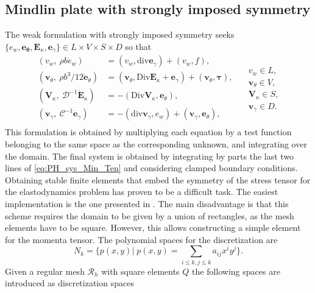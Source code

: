 \documentclass{ifacconf}
\begin{document}
\subsection{Mindlin plate with strongly imposed symmetry}\label{sec:min_strong}

The weak formulation with strongly imposed symmetry seeks $\{e_w, \bm{e}_{\bm{\theta}}, \bm{E}_{\kappa}, \bm{e}_{\gamma}\} \in L \times V \times S \times D$ so that 
\begin{equation}
\label{eq:weak_min_PH_strong}
\begin{aligned}
(v_w, \ \rho b \dot{e}_w) &= (v_w, \mathrm{div} \bm{e}_\gamma) + (v_w, f), \\ 
(\bm{v}_\theta, \ \rho b^3/12  \dot{\bm{e}}_\theta) &= (\bm{v}_\theta, \mathrm{Div} \bm{E}_\kappa + \bm{e}_\gamma) + (\bm{v}_\theta, \bm{\tau}), \\  
(\bm{V}_\kappa, \ \mathcal{D}^{-1} \dot{\bm{E}}_\kappa) &= -(\mathrm{Div} \bm{V}_\kappa,  \bm{e}_\theta), \\ 
(\bm{v}_\gamma, \ \mathcal{C}^{-1} \dot{\bm{e}}_\gamma) &= -(\mathrm{div} \bm{v}_\gamma, e_w ) + (\bm{v}_\gamma, \bm{e}_{\theta}), \\ 
\end{aligned} \quad
\begin{aligned}
v_w \in L, \\
\bm{v}_\theta \in V, \\
\bm{V}_\kappa \in S, \\
\bm{v}_\gamma \in D.
\end{aligned}
\end{equation}
This formulation is obtained by multiplying each equation by a test function belonging to the same space as the corresponding unknown, and integrating over the domain. The final system is obtained by integrating by parts the last two lines of \eqref{eq:PH_sys_Min_Ten} and considering clamped boundary conditions. Obtaining stable finite elements that embed the symmetry of the stress tensor for the elastodynamics problem has proven to be a difficult task. The easiest implementation is the one presented in \cite{becacheWave,becacheElas}. The main disadvantage is that this scheme requires the domain to be given by a union of rectangles, as the mesh elements have to be square. However, this allows constructing a simple element for the momenta tensor. The polynomial spaces for the discretization are
\[
N_{k} = \{p(x, y)| \; p(x, y) = \sum_{i\le k, j\le k} a_{ij} x^i y^j  \}.
\]
Given a regular mesh $\mathcal{R}_h$ with square elements $Q$ the following spaces are introduced as discretization spaces
\end{document}
